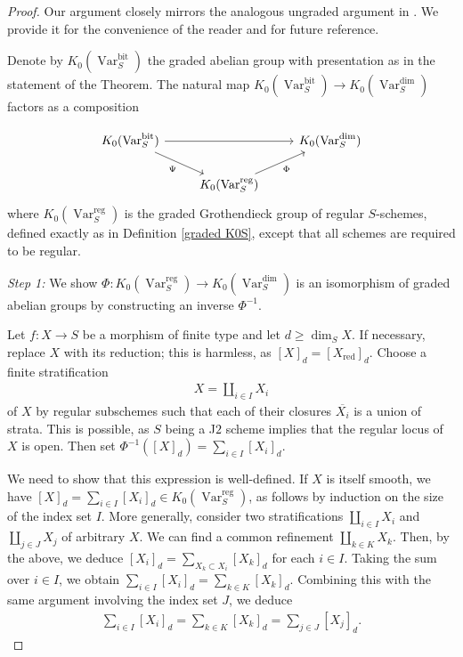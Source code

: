 \documentclass{amsart}
\theoremstyle{definition}
\DeclareMathOperator{\Var}{Var}
\DeclareMathOperator{\reg}{reg}
\DeclareMathOperator{\red}{red}
\DeclareMathOperator{\bit}{bit}
\newcommand{\KdimS}{K_0(\Var_S^{\dim})}
\numberwithin{equation}{section}
\begin{document}
\begin{proof}
Our argument closely mirrors the analogous ungraded argument in \cite[Theorems $3.1$ and $5.1$]{bittnerrelations}. We provide it for the convenience of the reader and for future reference.

Denote by $K_0(\Var_S^{\bit})$ the graded abelian group with presentation as in the statement of the Theorem. The natural map $K_0(\Var_S^{\bit}) \rightarrow \KdimS$ factors as a composition

\[
\begin{tikzcd}
K_0(\Var_S^{\bit}) \arrow[rd, "\Psi"'] \arrow[rr] & & \KdimS \\
& K_0(\Var_S^{\reg}) \arrow[ru, "\Phi"'] &
\end{tikzcd}
\]
where $K_0(\Var_S^{\reg})$ is the graded Grothendieck group of regular $S$-schemes, defined exactly as in Definition \ref{graded K0S}, except that all schemes are required to be regular. 

\textit{Step 1:} We show $\Phi: K_0(\Var_S^{\reg}) \rightarrow \KdimS$ is an isomorphism of graded abelian groups by constructing an inverse $\Phi^{-1}$.

Let $f:X \rightarrow S$ be a morphism of finite type and let $d \geq \dim_S X$. If necessary, replace $X$ with its reduction; this is harmless, as $[X]_d = [X_{\red}]_d$. Choose a finite stratification
\begin{align*}
    X = \coprod_{i \in I} X_i
\end{align*}
of $X$ by regular subschemes such that each of their closures $\overline{X_i}$ is a union of strata. This is possible, as $S$ being a J$2$ scheme implies that the regular locus of $X$ is open. Then set $\Phi^{-1}([X]_d) = \sum_{i \in I} [X_i]_d$. 

We need to show that this expression is well-defined. If $X$ is itself smooth, we have $[X]_d = \sum_{i \in I} [X_i]_d \in K_0(\Var_S^{\reg})$, as follows by induction on the size of the index set $I$. More generally, consider two stratifications $\coprod_{i \in I} X_i$ and $\coprod_{j\in J} X_j$ of arbitrary $X$. We can find a common refinement $\coprod_{k \in K} X_k$. Then, by the above, we deduce $[X_i]_d = \sum_{X_k \subset X_i} [X_k]_d$ for each $i \in I$. Taking the sum over $i \in I$, we obtain $\sum_{i \in I} [X_i]_d = \sum_{k \in K} [X_k]_d$. Combining this with the same argument involving the index set $J$, we deduce
\begin{align*}
    \sum_{i \in I} [X_i]_d = \sum_{k \in K} [X_k]_d = \sum_{j \in J} [X_j]_d.
\end{align*}


\end{proof}
\end{document}
